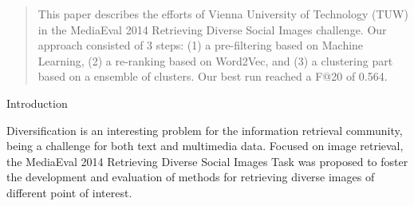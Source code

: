 \documentclass{acm_proc_article-me}
\begin{document}
\begin{abstract}
This paper describes the efforts of Vienna University of Technology (TUW) in the MediaEval 2014 Retrieving Diverse Social Images challenge.
Our approach consisted of 3 steps: (1) a pre-filtering based on Machine Learning, (2) a re-ranking based on Word2Vec, and (3) a clustering part based on a ensemble of clusters. 
Our best run reached a F@20 of 0.564. 

\end{abstract}

\begin{section}{Introduction}

Diversification is an interesting problem for the information retrieval community, 
being a challenge for both text and multimedia data.
Focused on image retrieval, the MediaEval 2014 Retrieving Diverse Social Images Task \cite{overview14}
was proposed to foster the development and evaluation of methods for retrieving 
diverse images of different point of interest.



\end{section}

\end{document}
